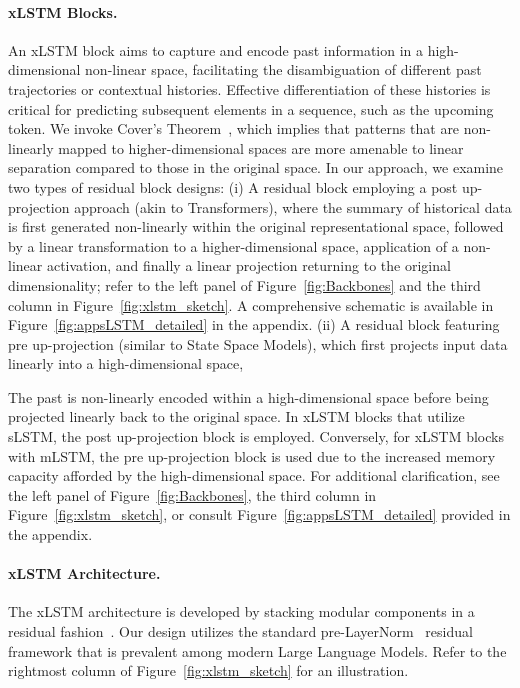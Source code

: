 \paragraph{xLSTM Blocks.}
\label{sec:xLSTMblock}
An xLSTM block aims to capture and encode past information in a high-dimensional non-linear space, facilitating the disambiguation of different past trajectories or contextual histories. Effective differentiation of these histories is critical for predicting subsequent elements in a sequence, such as the upcoming token. We invoke Cover’s Theorem~\citep{Cover:65}, which implies that patterns that are non-linearly mapped to higher-dimensional spaces are more amenable to linear separation compared to those in the original space. In our approach, we examine two types of residual block designs: (i) A residual block employing a post up-projection approach (akin to Transformers), where the summary of historical data is first generated non-linearly within the original representational space, followed by a linear transformation to a higher-dimensional space, application of a non-linear activation, and finally a linear projection returning to the original dimensionality; refer to the left panel of Figure~\ref{fig:Backbones} and the third column in Figure~\ref{fig:xlstm_sketch}. A comprehensive schematic is available in Figure~\ref{fig:appsLSTM_detailed} in the appendix. (ii) A residual block featuring pre up-projection (similar to State Space Models), which first projects input data linearly into a high-dimensional space,

The past is non-linearly encoded within a high-dimensional space before being projected linearly back to the original space. In xLSTM blocks that utilize sLSTM, the post up-projection block is employed. Conversely, for xLSTM blocks with mLSTM, the pre up-projection block is used due to the increased memory capacity afforded by the high-dimensional space. For additional clarification, see the left panel of Figure~\ref{fig:Backbones}, the third column in Figure~\ref{fig:xlstm_sketch}, or consult Figure~\ref{fig:appsLSTM_detailed} provided in the appendix.

\paragraph{xLSTM Architecture. }
\label{sec:xLSTMarchitecure}
The xLSTM architecture is developed by stacking modular components in a residual fashion~\citep{Srivastava:15,He:16}. Our design utilizes the standard pre-LayerNorm~\citep{Ba:16b} residual framework that is prevalent among modern Large Language Models. Refer to the rightmost column of Figure~\ref{fig:xlstm_sketch} for an illustration.

